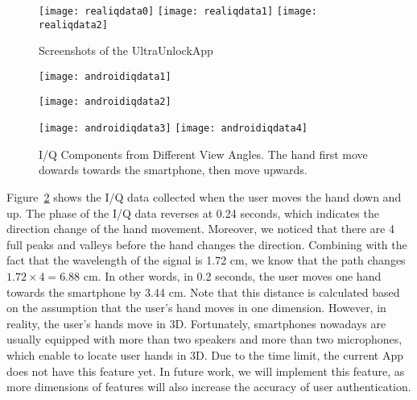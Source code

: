 \begin{figure}[h]
	\centering
	\begin{minipage}{.6\linewidth}
		\texttt{[image: realiqdata0]}
		\vspace{.1in}
		\texttt{[image: realiqdata1]}
		\vspace{.1in}
		\texttt{[image: realiqdata2]}
	\end{minipage}
	\caption{Screenshots of the UltraUnlockApp}	
	\label{fig:realIQ}
\end{figure}

\begin{figure}[!h]
	\centering
	\texttt{[image: androidiqdata1]}
	\begin{minipage}{.4\linewidth}
		\texttt{[image: androidiqdata2]}
	\end{minipage}
	\hfil
	\begin{minipage}{.5\linewidth}
		\texttt{[image: androidiqdata3]}
		\texttt{[image: androidiqdata4]}
	\end{minipage}
	\caption[I/Q Components Collected by UltraUnlockApp]{I/Q Components from Different View Angles. The hand first move dowards towards the smartphone, then move upwards.}
	\label{fig:androidiqdata}
\end{figure}

Figure~\ref{fig:androidiqdata} shows the I/Q data collected when the user moves the hand down and up. The phase of the I/Q data reverses at 0.24 seconds, which indicates the direction change of the hand movement. Moreover, we noticed that there are 4 full peaks and valleys before the hand changes the direction. Combining with the fact that the wavelength of the signal is 1.72 cm, we know that the path changes $1.72 \times 4 = 6.88$ cm. In other words, in 0.2 seconds, the user moves one hand towards the smartphone by 3.44 cm. Note that this distance is calculated based on the assumption that the user's hand moves in one dimension. However, in reality, the user's hands move in 3D. Fortunately, smartphones nowadays are usually equipped with more than two speakers and more than two microphones, which enable {\uu} to locate user hands in 3D. Due to the time limit, the current {\uu}App does not have this feature yet. In future work, we will implement this feature, as more dimensions of features will also increase the accuracy of user authentication.

